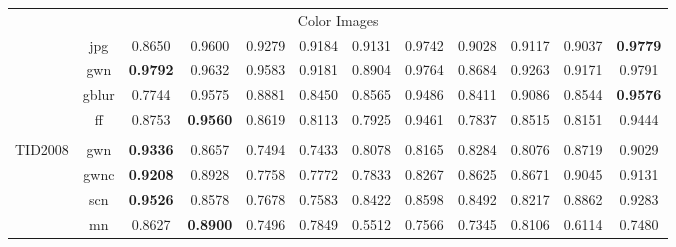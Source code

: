 \documentclass[11pt,a4paper]{article}
\begin{document}
\begin{table}[!htb]
\begin{scriptsize}
\begin{threeparttable}
\begin{tabular}{*{12}{c}}
\\
\multicolumn{12}{c}{Color Images}\0.1cm]
\multirow{5}{*}{LIVE} & jpg2k & \cellcolor{green!25}0.8747 & \cellcolor{green!25}0.9476 & \cellcolor{green!25}0.8925 & \cellcolor{green!25}0.8697 & \cellcolor{green!25}0.8564 & \textbf{0.9725} & \cellcolor{green!25}0.8800 & \cellcolor{green!25}0.9036 & \cellcolor{green!25}0.8662 & 0.9673\\
& jpg & \cellcolor{green!25}0.8650 & \cellcolor{green!25}0.9600 & \cellcolor{green!25}0.9279 & \cellcolor{green!25}0.9184 & \cellcolor{green!25}0.9131 & 0.9742 & \cellcolor{green!25}0.9028 & \cellcolor{green!25}0.9117 & \cellcolor{green!25}0.9037 & \textbf{0.9779}\\
& gwn & \textbf{0.9792} & \cellcolor{green!25}0.9632 & \cellcolor{green!25}0.9583 & \cellcolor{green!25}0.9181 & \cellcolor{green!25}0.8904 & 0.9764 & \cellcolor{green!25}0.8684 & \cellcolor{green!25}0.9263 & \cellcolor{green!25}0.9171 & 0.9791\\
& gblur & \cellcolor{green!25}0.7744 & 0.9575 & \cellcolor{green!25}0.8881 & \cellcolor{green!25}0.8450 & \cellcolor{green!25}0.8565 & 0.9486 & \cellcolor{green!25}0.8411 & \cellcolor{green!25}0.9086 & \cellcolor{green!25}0.8544 & \textbf{0.9576}\\
& ff & \cellcolor{green!25}0.8753 & \textbf{0.9560} & \cellcolor{green!25}0.8619 & \cellcolor{green!25}0.8113 & \cellcolor{green!25}0.7925 & 0.9461 & \cellcolor{green!25}0.7837 & \cellcolor{green!25}0.8515 & \cellcolor{green!25}0.8151 & 0.9444\\
\\
\multirow{17}{*}{TID2008} & gwn & \textbf{0.9336} & 0.8657 & \cellcolor{green!25}0.7494 & \cellcolor{green!25}0.7433 & \cellcolor{green!25}0.8078 & \cellcolor{green!25}0.8165 & \cellcolor{green!25}0.8284 & \cellcolor{green!25}0.8076 & 0.8719 & 0.9029\\
& gwnc & \textbf{0.9208} & 0.8928 & \cellcolor{green!25}0.7758 & \cellcolor{green!25}0.7772 & \cellcolor{green!25}0.7833 & \cellcolor{green!25}0.8267 & 0.8625 & 0.8671 & 0.9045 & 0.9131\\
& scn & \textbf{0.9526} & \cellcolor{green!25}0.8578 & \cellcolor{green!25}0.7678 & \cellcolor{green!25}0.7583 & \cellcolor{green!25}0.8422 & \cellcolor{green!25}0.8598 & \cellcolor{green!25}0.8492 & \cellcolor{green!25}0.8217 & 0.8862 & 0.9283\\
& mn & \cellcolor{red!25}0.8627 & \cellcolor{red!25}\textbf{0.8900} & 0.7496 & 0.7849 & \cellcolor{green!25}0.5512 & 0.7566 & 0.7345 & 0.8106 & 0.6114 & 0.7480\\

\end{tabular}
\end{threeparttable}
\end{scriptsize}
\end{table}
\end{document}
